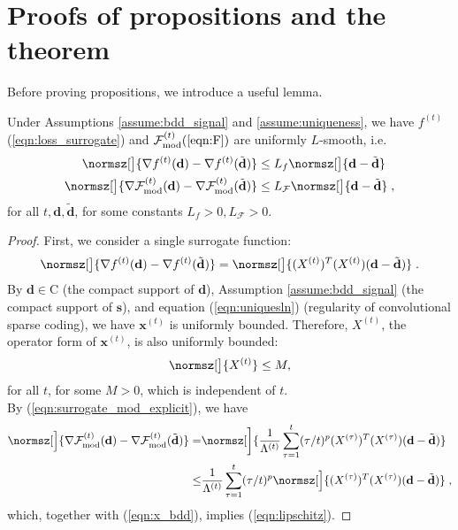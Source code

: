 \documentclass[final]{siamart1116}
\newcommand{\mb}[1]{\mathbf{#1}}
\def \F  {\mathcal{F}}
\begin{document}
\section{Proofs of propositions and the theorem}

Before proving propositions, we introduce a useful lemma.

\begin{lemma}
\label{lemma:lipschitz} Under Assumptions \ref{assume:bdd_signal} and \ref{assume:uniqueness}, we have $f^{(t)}$ (\ref{eqn:loss_surrogate}) and $\F^{(t)}_{\mathrm{mod}} (\ref{eqn:F}) $ are uniformly $L$-smooth, i.e.
\begin{equation}
\label{eqn:lipschitz}
\begin{aligned}
\normsz[\big]{\nabla f^{(t)}(\mb{d}) - \nabla f^{(t)}(\tilde{\mb{d}})} &\leq L_f \normsz[\big]{\mb{d} - \tilde{\mb{d}} }\\
\normsz[\big]{\nabla \F^{(t)}_{\mathrm{mod}}(\mb{d}) - \nabla \F^{(t)}_{\mathrm{mod}}(\tilde{\mb{d}})} &\leq L_{\F} \normsz[\big]{\mb{d} - \tilde{\mb{d}} } \;,
\end{aligned}
\end{equation}
for all $t, \mb{d}, \tilde{\mb{d}}$, for some constants $L_f > 0,  L_{\F} > 0$.
\end{lemma}
\begin{proof}
First, we consider a single surrogate function:
\[
\normsz[\big]{\nabla f^{(t)}(\mb{d}) - \nabla f^{(t)}(\tilde{\mb{d}})} = \normsz[\big]{(X^{(t)})^T(X^{(t)})(\mb{d}-\tilde{\mb{d}})} \;.
\]
By $\mb{d} \in \text{C}$ (the compact support of $\mb{d}$), Assumption \ref{assume:bdd_signal} (the compact support of $\mb{s}$), and equation (\ref{eqn:uniquesln}) (regularity of convolutional sparse coding), we have $\mb{x}^{(t)}$ is uniformly bounded. Therefore, $X^{(t)}$, the operator form of $\mb{x}^{(t)}$, is also uniformly bounded:
\begin{equation}
\label{eqn:x_bdd}
\normsz[\big]{X^{(t)}} \leq M,
\end{equation}
for all $t$, for some $M>0$, which is independent of $t$.\\
By (\ref{eqn:surrogate_mod_explicit}), we have
\[\begin{aligned}
  \normsz[\Big]{\nabla \F^{(t)}_{\mathrm{mod}}(\mb{d}) - \nabla \F^{(t)}_{\mathrm{mod}}(\tilde{\mb{d}})}
  = &\normsz[\bigg]{\frac{1}{\Lambda^{(t)}}\sum_{\tau=1}^t(\tau/t)^p(X^{(\tau)})^T(X^{(\tau)})(\mb{d}-\tilde{\mb{d}})} \\
  \leq & \frac{1}{\Lambda^{(t)}}\sum_{\tau=1}^t(\tau/t)^p \normsz[\Big]{(X^{(\tau)})^T(X^{(\tau)})(\mb{d}-\tilde{\mb{d}})} \;,
\end{aligned}\]
which, together with (\ref{eqn:x_bdd}), implies (\ref{eqn:lipschitz}).
\end{proof}
\end{document}
